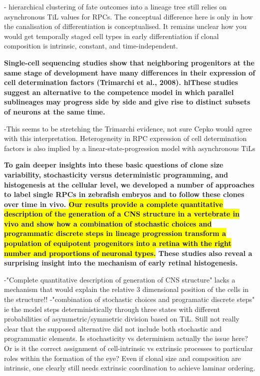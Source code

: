 \documentclass{ut-thesis}
\begin{document}
- hierarchical clustering of fate outcomes into a lineage tree still relies on asynchronous TiL values for RPCs. The conceptual difference here is only in how the canalisation of differentiation is conceptualised. It remains unclear how you would get temporally staged cell types in early differentiation if clonal composition is intrinsic, constant, and time-independent.

\bigskip

\textbf{
Single-cell sequencing studies show that neighboring progenitors at the
same stage of development have many differences in their
expression of cell determination factors (Trimarchi et al., 2008).
hl{These studies suggest an alternative to the competence model
in which parallel sublineages may progress side by side and
give rise to distinct subsets of neurons at the same time.}
}

\bigskip

-This seems to be stretching the Trimarchi evidence, not sure Cepko would agree with this interpretation. Heterogeneity in RPC expression of cell determination factors is also implied by a linear-state-progression model with asynchronous TiLs

\bigskip

\textbf{
To gain deeper insights into these basic questions of clone
size variability, stochasticity versus deterministic programming,
and histogenesis at the cellular level, we developed a number
of approaches to label single RPCs in zebrafish embryos and
to follow these clones over time in vivo. \hl{Our results provide
a complete quantitative description of the generation of a CNS
structure in a vertebrate in vivo and show how a combination
of stochastic choices and programmatic discrete steps in
lineage progression transform a population of equipotent
progenitors into a retina with the right number and proportions
of neuronal types.} These studies also reveal a surprising insight
into the mechanism of early retinal histogenesis.
}

\bigskip

-"Complete quantitative description of generation of CNS structure" lacks a mechanism that would explain the relative 3 dimensional position of the cells in the structure!!
-"combination of stochastic choices and programatic discrete steps" ie the model steps deterministically through three states with different probabilities of asymmetric/symmetric division based on TiL. Still not really clear that the supposed alternative did not include both stochastic and programmatic elements. Is stochasticity vs determinism actually the issue here? Or is it the correct assignment of cell-intrinsic vs extrinsic processes to particular roles within the formation of the eye? Even if clonal size and composition are intrinsic, one clearly still needs extrinsic coordination to achieve laminar ordering.
\end{document}
